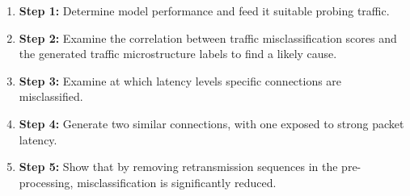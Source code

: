\documentclass[10pt,conference]{IEEEtran}
\begin{document}
\begin{enumerate}
\item [] \textbf{Step 1:} Determine model performance and feed it suitable probing traffic.
\item [] \textbf{Step 2:} Examine the correlation between traffic misclassification scores and the generated traffic microstructure labels to find a likely cause.%
\item [] \textbf{Step 3:} Examine at which latency levels specific connections are misclassified.

\item [] \textbf{Step 4:} Generate two similar connections, with one exposed to strong packet latency.%
\item [] \textbf{Step 5:} Show that by removing retransmission sequences in the pre-processing, misclassification is significantly reduced.
\end{enumerate}







\end{document}
